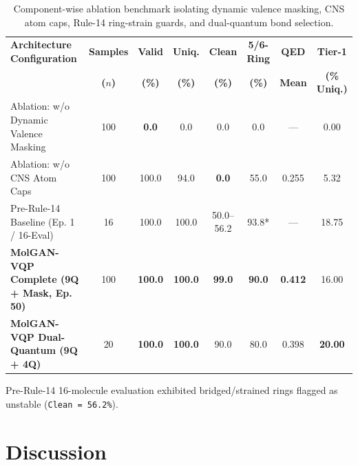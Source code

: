 \documentclass[10pt,a4paper]{article}
\begin{document}
\vspace{-0.10cm}
\begin{table}[H]
\centering
\caption{Component-wise ablation benchmark isolating dynamic valence masking, CNS atom caps, Rule-14 ring-strain guards, and dual-quantum bond selection.}
\label{tab:ablations}
\setlength{\tabcolsep}{4pt}
\footnotesize
\begin{tabularx}{\textwidth}{@{}>{\raggedright\arraybackslash}X ccccccc@{}}
\toprule
\textbf{Architecture Configuration} & \textbf{Samples} & \textbf{Valid} & \textbf{Uniq.} & \textbf{Clean} & \textbf{5/6-Ring} & \textbf{QED} & \textbf{Tier-1} \\
 & \textbf{($n$)} & \textbf{(\%)} & \textbf{(\%)} & \textbf{(\%)} & \textbf{(\%)} & \textbf{Mean} & \textbf{(\% Uniq.)} \\
\midrule
Ablation: w/o Dynamic Valence Masking & 100 & \textbf{0.0} & 0.0 & 0.0 & 0.0 & --- & 0.00 \\
Ablation: w/o CNS Atom Caps & 100 & 100.0 & 94.0 & \textbf{0.0} & 55.0 & 0.255 & 5.32 \\
Pre-Rule-14 Baseline (Ep. 1 / 16-Eval) & 16 & 100.0 & 100.0 & 50.0--56.2 & 93.8* & --- & 18.75 \\
\rowcolor{lightgray}
\textbf{MolGAN-VQP Complete (9Q + Mask, Ep. 50)} & 100 & \textbf{100.0} & \textbf{100.0} & \textbf{99.0} & \textbf{90.0} & \textbf{0.412} & 16.00 \\
\rowcolor{lightgray}
\textbf{MolGAN-VQP Dual-Quantum (9Q + 4Q)} & 20 & \textbf{100.0} & \textbf{100.0} & 90.0 & 80.0 & 0.398 & \textbf{20.00} \\
\bottomrule
\end{tabularx}
\par\vspace{0.1cm}
\raggedright\footnotesize *Pre-Rule-14 16-molecule evaluation exhibited bridged/strained rings flagged as unstable (\texttt{Clean = 56.2\%}).
\end{table}

\clearpage



\section{Discussion}
\end{document}
